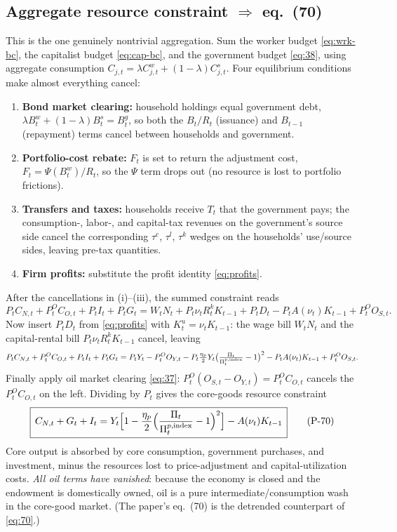 \subsection{Aggregate resource constraint \texorpdfstring{$\Rightarrow$}{=>} eq.\ (70)}
This is the one genuinely nontrivial aggregation. Sum the worker budget \eqref{eq:wrk-bc}, the
capitalist budget \eqref{eq:cap-bc}, and the government budget \eqref{eq:38}, using aggregate
consumption $C_{j,t}=\lambda C^w_{j,t}+(1-\lambda)C^s_{j,t}$. Four equilibrium conditions make almost
everything cancel:
\begin{enumerate}[nosep,label=(\roman*)]
\item \textbf{Bond market clearing:} household holdings equal government debt,
$\lambda B^w_t+(1-\lambda)B^s_t=B^g_t$, so both the $B_t/R_t$ (issuance) and $B_{t-1}$ (repayment)
terms cancel between households and government.
\item \textbf{Portfolio-cost rebate:} $F_t$ is set to return the adjustment cost, $F_t=\Psi(B^w_t)/R_t$,
so the $\Psi$ term drops out (no resource is lost to portfolio frictions).
\item \textbf{Transfers and taxes:} households receive $T_t$ that the government pays; the consumption-,
labor-, and capital-tax revenues on the government's source side cancel the corresponding $\tau^c$,
$\tau^l$, $\tau^k$ wedges on the households' use/source sides, leaving pre-tax quantities.
\item \textbf{Firm profits:} substitute the profit identity \eqref{eq:profits}.
\end{enumerate}
After the cancellations in (i)--(iii), the summed constraint reads
\begin{equation}\label{eq:rc-star}
P_tC_{N,t}+P^O_tC_{O,t}+P_tI_t+P_tG_t
=W_tN_t+P_t\nu_tR^k_tK_{t-1}+P_tD_t-P_tA(\nu_t)K_{t-1}+P^O_tO_{S,t}.
\end{equation}
Now insert $P_tD_t$ from \eqref{eq:profits} with $K^u_t=\nu_tK_{t-1}$: the wage bill $W_tN_t$ and the
capital-rental bill $P_t\nu_tR^k_tK_{t-1}$ cancel, leaving
\[
P_tC_{N,t}+P^O_tC_{O,t}+P_tI_t+P_tG_t
=P_tY_t-P^O_tO_{Y,t}-P_t\tfrac{\eta_p}{2}Y_t\big(\tfrac{\Pi_t}{\Pi^{p,\text{index}}_t}-1\big)^2
-P_tA(\nu_t)K_{t-1}+P^O_tO_{S,t}.
\]
Finally apply oil market clearing \eqref{eq:37}: $P^O_t(O_{S,t}-O_{Y,t})=P^O_tC_{O,t}$ cancels the
$P^O_tC_{O,t}$ on the left. Dividing by $P_t$ gives the core-goods resource constraint
\begin{equation}\label{eq:70}
\boxed{\,C_{N,t}+G_t+I_t=Y_t\Big[1-\frac{\eta_p}{2}\Big(\frac{\Pi_t}{\Pi^{p,\text{index}}_t}-1\Big)^2\Big]-A(\nu_t)K_{t-1}\,}\tag{P-70}
\end{equation}
Core output is absorbed by core consumption, government purchases, and investment, minus the resources
lost to price-adjustment and capital-utilization costs. \emph{All oil terms have vanished}: because the
economy is closed and the endowment is domestically owned, oil is a pure intermediate/consumption wash
in the core-good market. (The paper's eq.\ (70) is the detrended counterpart of \eqref{eq:70}.)

